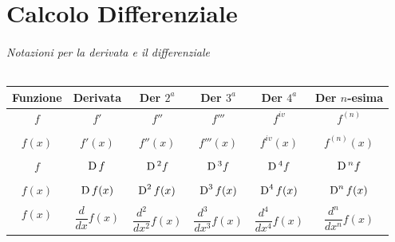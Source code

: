 \documentclass{article}
\theoremstyle{plain}
\theoremstyle{definition}
\theoremstyle{remark}
\begin{document}
\vspace{50pt}
\part{Calcolo Differenziale}
\vspace{50pt}

\paragraph{Notazioni per la derivata e il differenziale}
\begin{center}
    \begin{table}[H]
    \centering
    \begin{tabular}{cccccc}
    Funzione & Derivata & Der $2^a$ & Der $3^a$ & Der $4^a$ & Der $n$-esima\\
    \hline
    $f$&$f'$&$f''$&$f'''$&$f^{iv}$&$f^{(n)}$\\\\
    $f(x)$&$f'(x)$&$f''(x)$&$f'''(x)$&$f^{iv}(x)$&$f^{(n)}(x)$\\\\
    $f$&$\textup{D}\,f$&$\textup{D}\,^2f$&$\textup{D}\,^3f$&$\textup{D}\,^4f$&$\textup{D}\,^nf$\\\\
    $f(x)$&$\textup{D}\,f(x)$&$\textup{D}^2\,f(x)$&$\textup{D}^3\,f(x)$&$\textup{D}^4\,f(x)$&$\textup{D}^n\,f(x)$\\\\
    $f(x)$&$\dfrac{d}{dx}f(x)$&$\dfrac{d^2}{dx^2}f(x)$&$\dfrac{d^3}{dx^3}f(x)$&$\dfrac{d^4}{dx^4}f(x)$&$\dfrac{d^n}{dx^n}f(x)$
    \end{tabular}    
    \end{table}
\end{center}
\end{document}
